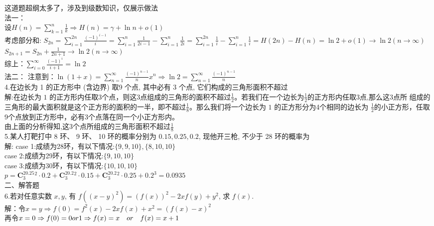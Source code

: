 \documentclass[a4paper,11pt,UTF8]{article}
\begin{document}
这道题超纲太多了，涉及到级数知识，仅展示做法\\
法一：\\
设$\displaystyle H(n)=\sum_{k=1}^{n}\frac{1}{k}\Rightarrow H(n)=\gamma+\ln n+o(1)$\\
考虑部分和:
$\displaystyle S_{2n}=\sum_{i=1}^{2n}{\frac{(-1)^{i-1}}{i}}=\sum_{i=1}^{n}\frac{1}{2i-1}-\sum_{i=1}^{n}\frac{1}{2i}=\sum_{i=1}^{2n}\frac{1}{i}-\sum_{i=1}^{n}\frac{1}{i}=H(2n)-H(n)=\ln2+o(1)\rightarrow \ln2(n\rightarrow\infty)$\\
$\displaystyle S_{2n+1}=S_{2n}+\frac{1}{2n+1}\rightarrow\ln2(n\rightarrow\infty)$\\
综上：$\displaystyle\sum_{i=0}^{\infty} \frac{(-1)^{i}}{i+1}=\ln2$\\
法二：
注意到：$\displaystyle\ln(1+x)=\sum^\infty_{n=1}\frac{(-1)^{n-1}}{n}x^n\Rightarrow\ln2=\sum^\infty_{n=1}\frac{(-1)^{n-1}}{n}$\\
4.在边长为 1 的正方形中 (含边界) 取9 个点, 其中必有 3 个点, 它们构成的三角形面积不超过\\
解:在边长为 $\text{1}$ 的正方形内任取3个点，则这3点组成的三角形的面积不超过$\displaystyle\frac{1}{2}$。若我们在一个边长为$\displaystyle\frac{1}{2}$的正方形内任取3点,那么这3点所
组成的三角形的最大面积就是这个正方形的面积的一半，即不超过$\displaystyle\frac{1}{8}$。那么我们将一个边长为 $\text{1}$ 的正方形分为4个相同的边长为 $\displaystyle\frac{1}{2}$的小正方形，任取9个点放到正方形中，必有3个点落在同一个小正方形内。\\
由上面的分析得知,这3个点所组成的三角形面积不超过$\displaystyle\frac{1}{8}$\\
5.某人打靶打中 8 环、 9 环、 10 环的概率分别为 $0.15,0.25,0.2$, 现他开三枪, 不少于 28 环的概率为\\
解:
case 1:成绩为28环，有以下情况:$\{9,9,10\},\{8,10,10\}$\\
case 2:成绩为29环，有以下情况:$\{9,10,10\}$\\
case 3:成绩为30环，有以下情况:$\{10,10,10\}$\\
$p=\mathbf{C}_3^20.25^2\cdot0.2+\mathbf{C}_3^20.2^2\cdot0.15+\mathbf{C}_3^20.2^2\cdot0.25+0.2^3=0.0935$\\
二、解答题\\
6.若对任意实数 $x, y$, 有 $f\left((x-y)^2\right)=(f(x))^2-2 x  f(y)+y^2$, 求 $f(x)$.\\
解：令$x=y\Rightarrow f(0)=f^2(x)-2xf(x)+x^2=(f(x)-x)^2$\\
再令$x=0\Rightarrow f(0)=0or1\\\Rightarrow f(x)=x\quad or\quad f(x)=x+1$\\
\end{document}

